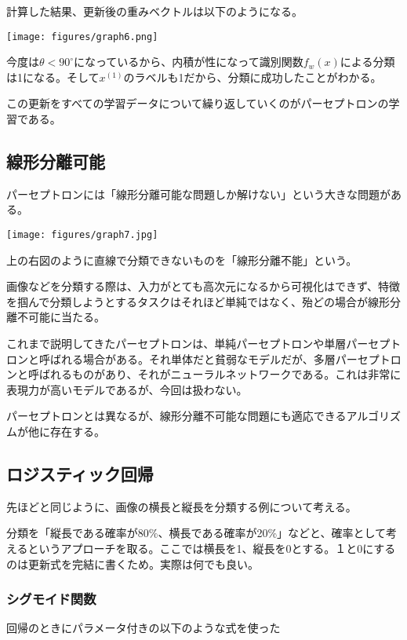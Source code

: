 \documentclass{jsarticle}
\begin{document}
計算した結果、更新後の重みベクトルは以下のようになる。

\begin{center}
  \texttt{[image: figures/graph6.png]}
\end{center}

今度は$\theta < 90^\circ$になっているから、内積が性になって識別関数$f_w(x)$による分類は1になる。そして$x^{(1)}$のラベルも1だから、分類に成功したことがわかる。

この更新をすべての学習データについて繰り返していくのがパーセプトロンの学習である。

\subsection{線形分離可能}
パーセプトロンには「線形分離可能な問題しか解けない」という大きな問題がある。

\begin{center}
  \texttt{[image: figures/graph7.jpg]}
\end{center}

上の右図のように直線で分類できないものを「線形分離不能」という。

画像などを分類する際は、入力がとても高次元になるから可視化はできず、特徴を掴んで分類しようとするタスクはそれほど単純ではなく、殆どの場合が線形分離不可能に当たる。

これまで説明してきたパーセプトロンは、単純パーセプトロンや単層パーセプトロンと呼ばれる場合がある。それ単体だと貧弱なモデルだが、多層パーセプトロンと呼ばれるものがあり、それがニューラルネットワークである。これは非常に表現力が高いモデルであるが、今回は扱わない。

パーセプトロンとは異なるが、線形分離不可能な問題にも適応できるアルゴリズムが他に存在する。

\subsection{ロジスティック回帰}
先ほどと同じように、画像の横長と縦長を分類する例について考える。

分類を「縦長である確率が80\%、横長である確率が20\%」などと、確率として考えるというアプローチを取る。ここでは横長を1、縦長を0とする。１と0にするのは更新式を完結に書くため。実際は何でも良い。

\subsubsection{シグモイド関数}
回帰のときにパラメータ付きの以下のような式を使った
\end{document}
